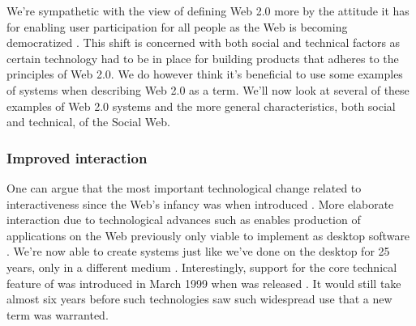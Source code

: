 We're sympathetic with the view of defining
Web 2.0 more by the attitude it has for enabling user participation for all
people \citep[]{lin07} as the Web is becoming democratized
\citep{graham05}. This shift is concerned with both social and
technical factors as certain technology had to be in place for building
products that adheres to the principles of Web 2.0. We do however think it's
beneficial to use some examples of systems when describing Web 2.0 as a term.
We'll now look at several of these examples of Web 2.0 systems and
the more general characteristics, both social and technical,
of the Social Web.

\removeline

\subsubsection{Improved interaction}
One can argue that the most important
technological change related to interactiveness since the Web's infancy was
when \citet{garrett05} introduced .%
More elaborate interaction due to technological advances such as 
enables production of applications on the Web previously only viable to
implement as desktop software .
We're now able to create systems just like we've done on the desktop for 25
years, only in a different medium \citep[]{arnowitz07}.
Interestingly, support for the core technical feature of  was
introduced in March 1999 when 
was released \citep{microsoft99}. It would still take almost six years before
such technologies saw such widespread use that a new term was warranted.

